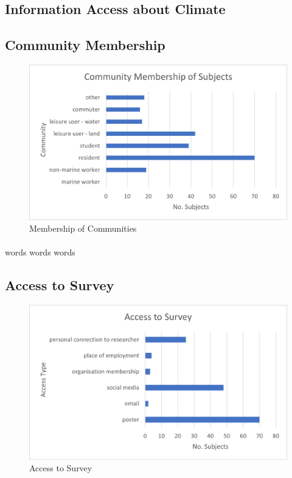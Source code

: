 \subsection{Information Access about Climate}

\subsection{Community Membership}

\begin{figure}[h]
    \centering
    \includegraphics{fig_results/com-mem-horizontal.png}
    \caption{Membership of Communities}
    \label{fig:my_label}
\end{figure}
\paragraph{}
words words words 
\subsection{Access to Survey}

\begin{figure}[h]
    \centering
    \includegraphics{fig_results/access_survey.png}
    \caption{Access to Survey}
    \label{fig:my_label}
\end{figure}
